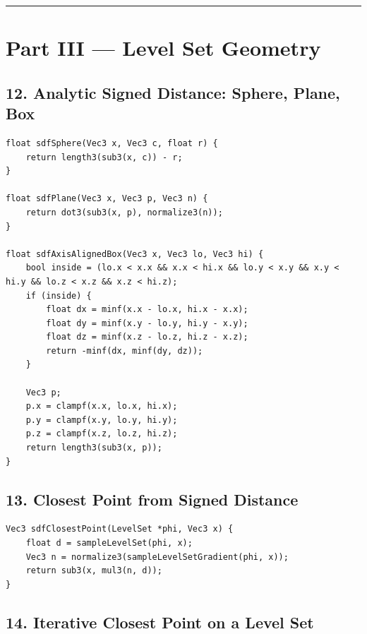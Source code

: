 \documentclass[10pt,letterpaper]{article}
\begin{document}
\medskip\hrule\medskip

\clearpage
{}
\section*{Part III --- Level Set Geometry}

\subsection*{12. Analytic Signed Distance: Sphere, Plane, Box}

\begin{verbatim}
float sdfSphere(Vec3 x, Vec3 c, float r) {
    return length3(sub3(x, c)) - r;
}

float sdfPlane(Vec3 x, Vec3 p, Vec3 n) {
    return dot3(sub3(x, p), normalize3(n));
}

float sdfAxisAlignedBox(Vec3 x, Vec3 lo, Vec3 hi) {
    bool inside = (lo.x < x.x && x.x < hi.x && lo.y < x.y && x.y < hi.y && lo.z < x.z && x.z < hi.z);
    if (inside) {
        float dx = minf(x.x - lo.x, hi.x - x.x);
        float dy = minf(x.y - lo.y, hi.y - x.y);
        float dz = minf(x.z - lo.z, hi.z - x.z);
        return -minf(dx, minf(dy, dz));
    }

    Vec3 p;
    p.x = clampf(x.x, lo.x, hi.x);
    p.y = clampf(x.y, lo.y, hi.y);
    p.z = clampf(x.z, lo.z, hi.z);
    return length3(sub3(x, p));
}
\end{verbatim}

\subsection*{13. Closest Point from Signed Distance}

\begin{verbatim}
Vec3 sdfClosestPoint(LevelSet *phi, Vec3 x) {
    float d = sampleLevelSet(phi, x);
    Vec3 n = normalize3(sampleLevelSetGradient(phi, x));
    return sub3(x, mul3(n, d));
}
\end{verbatim}

\subsection*{14. Iterative Closest Point on a Level Set}
\end{document}
